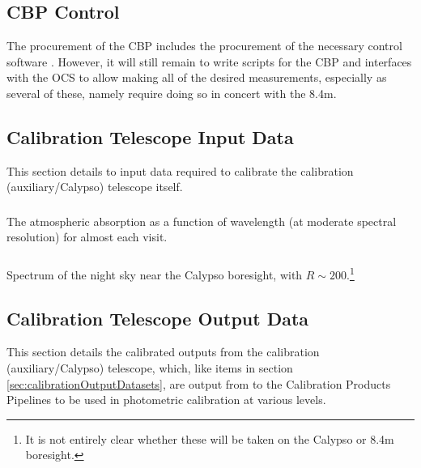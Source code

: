 


\subsection{CBP Control}\label{CBP_control}
The procurement of the CBP includes the procurement of the necessary control software  . However, it will still remain to write scripts for the CBP and interfaces with the OCS to allow making all of the desired measurements, especially as several of these, namely  require doing so in concert with the 8.4m.

















%
%
%
%
%
%
%
%


\subsection{Calibration Telescope Input Data}
\label{sec:calibrationTelescopeDatasets}
This section details to input data required to calibrate the calibration (auxiliary/Calypso) telescope itself.


\subsubsection{}\label{calypso:atmosphericAbsorption} The atmospheric absorption as a function of wavelength (at
moderate spectral resolution) for almost each visit.
\subsubsection{}\label{calypso:nightSkySpectrum} Spectrum of the night sky near the Calypso boresight, with $R
\sim 200$.\footnote{It is not entirely clear whether these will be taken on the Calypso or 8.4m	boresight.}



\subsection{Calibration Telescope Output Data}
\label{sec:calibrationTelescopeDatasets}
This section details the calibrated outputs from the calibration (auxiliary/Calypso) telescope, which, like items in section \ref{sec:calibrationOutputDatasets}, are output from to the Calibration Products Pipelines to be used in photometric calibration at various levels.


